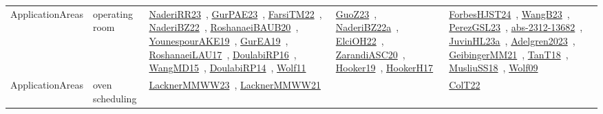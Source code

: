 {\begin{longtable}{lp{3cm}>{\raggedright\arraybackslash}p{6cm}>{\raggedright\arraybackslash}p{6cm}>{\raggedright\arraybackslash}p{8cm}}
ApplicationAreas & operating room & \href{../works/NaderiRR23.pdf}{NaderiRR23}~\cite{NaderiRR23}, \href{../works/GurPAE23.pdf}{GurPAE23}~\cite{GurPAE23}, \href{../works/FarsiTM22.pdf}{FarsiTM22}~\cite{FarsiTM22}, \href{../works/NaderiBZ22.pdf}{NaderiBZ22}~\cite{NaderiBZ22}, \href{../works/RoshanaeiBAUB20.pdf}{RoshanaeiBAUB20}~\cite{RoshanaeiBAUB20}, \href{../works/YounespourAKE19.pdf}{YounespourAKE19}~\cite{YounespourAKE19}, \href{../works/GurEA19.pdf}{GurEA19}~\cite{GurEA19}, \href{../works/RoshanaeiLAU17.pdf}{RoshanaeiLAU17}~\cite{RoshanaeiLAU17}, \href{../works/DoulabiRP16.pdf}{DoulabiRP16}~\cite{DoulabiRP16}, \href{../works/WangMD15.pdf}{WangMD15}~\cite{WangMD15}, \href{../works/DoulabiRP14.pdf}{DoulabiRP14}~\cite{DoulabiRP14}, \href{../works/Wolf11.pdf}{Wolf11}~\cite{Wolf11} & \href{../works/GuoZ23.pdf}{GuoZ23}~\cite{GuoZ23}, \href{../works/NaderiBZ22a.pdf}{NaderiBZ22a}~\cite{NaderiBZ22a}, \href{../works/ElciOH22.pdf}{ElciOH22}~\cite{ElciOH22}, \href{../works/ZarandiASC20.pdf}{ZarandiASC20}~\cite{ZarandiASC20}, \href{../works/Hooker19.pdf}{Hooker19}~\cite{Hooker19}, \href{../works/HookerH17.pdf}{HookerH17}~\cite{HookerH17} & \href{../works/ForbesHJST24.pdf}{ForbesHJST24}~\cite{ForbesHJST24}, \href{../works/WangB23.pdf}{WangB23}~\cite{WangB23}, \href{../works/PerezGSL23.pdf}{PerezGSL23}~\cite{PerezGSL23}, \href{../works/abs-2312-13682.pdf}{abs-2312-13682}~\cite{abs-2312-13682}, \href{../works/JuvinHL23a.pdf}{JuvinHL23a}~\cite{JuvinHL23a}, \href{../works/Adelgren2023.pdf}{Adelgren2023}~\cite{Adelgren2023}, \href{../works/GeibingerMM21.pdf}{GeibingerMM21}~\cite{GeibingerMM21}, \href{../works/TanT18.pdf}{TanT18}~\cite{TanT18}, \href{../works/MusliuSS18.pdf}{MusliuSS18}~\cite{MusliuSS18}, \href{../works/Wolf09.pdf}{Wolf09}~\cite{Wolf09}\\
ApplicationAreas & oven scheduling & \href{../works/LacknerMMWW23.pdf}{LacknerMMWW23}~\cite{LacknerMMWW23}, \href{../works/LacknerMMWW21.pdf}{LacknerMMWW21}~\cite{LacknerMMWW21} &  & \href{../works/ColT22.pdf}{ColT22}~\cite{ColT22}\\

\end{longtable}}
